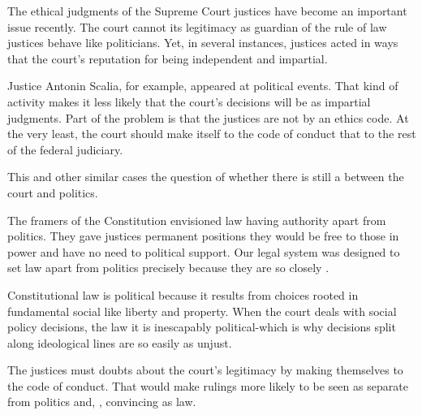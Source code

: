 
\qquad The ethical judgments of the Supreme Court justices have become an
important issue recently. The court cannot \underline{\quad} its legitimacy as
guardian of the rule of law \underline{\quad} justices behave like politicians.
Yet, in several instances, justices acted in ways that \underline{\quad} the court's
reputation for being independent and impartial.

\qquad Justice Antonin Scalia, for example, appeared at political events.
That kind of activity makes it less likely that the court's decisions
will be \underline{\quad} as impartial judgments. Part of the problem is that the
justices are not \underline{\quad} by an ethics code. At the very least, the court
should make itself \underline{\quad} to the code of conduct that \underline{\quad} to the rest of
the federal judiciary.

\qquad This and other similar cases \underline{\quad} the question of whether there is still 
a \underline{\quad} between the court and politics.

\qquad The framers of the Constitution envisioned law \underline{\quad}  having authority
apart from politics. They gave justices permanent positions \underline{\quad}  they 
would be free to \underline{\quad}  those in power and have no need to \underline{\quad}  political
support. Our legal system was designed to set law apart from politics
precisely because they are so closely \underline{\quad}.

\qquad Constitutional law is political because it results from choices rooted
in fundamental social \underline{\quad}  like liberty and property. When the court
deals with social policy decisions, the law it \underline{\quad}  is inescapably
political-which is why decisions split along ideological lines are so
easily \underline{\quad}  as unjust.

\qquad The justices must \underline{\quad}  doubts about the court's legitimacy by making
themselves \underline{\quad}  to the code of conduct. That would make rulings more
likely to be seen as separate from politics and, \underline{\quad}  , convincing as
law.

\vspace{6pt}

